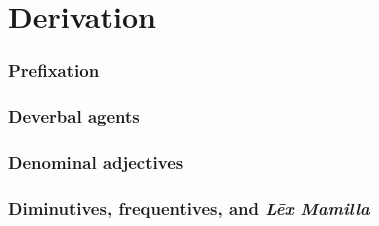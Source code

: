 \chapter{Derivation}

\subsection{Prefixation}

\subsection{Deverbal agents}

\subsection{Denominal adjectives}

\subsection{Diminutives, frequentives, and \emph{Lēx Mamilla}}
